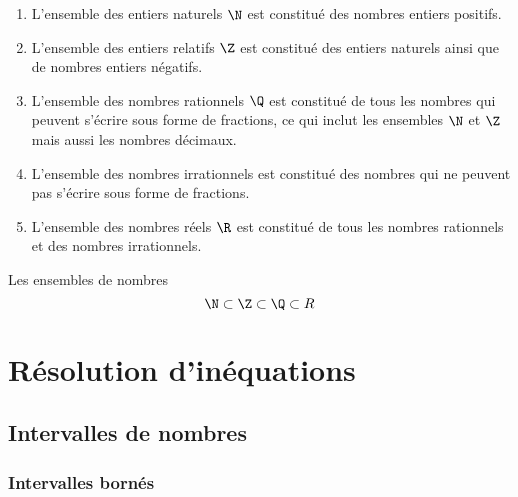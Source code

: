 \documentclass[xcolor={dvipsnames,svgnames,table}]{beamer}
\begin{document}
\begin{frame}
    \begin{definition}\pause
        \begin{enumerate}
            \item L'ensemble des entiers \alert{naturels} $\N$ est constitué des nombres entiers positifs.\pause
            \item L'ensemble des entiers \alert{relatifs} $\Z$ est constitué des entiers naturels ainsi que de nombres entiers négatifs.\pause
            \item L'ensemble des nombres \alert{rationnels} $\Q$ est constitué de tous les nombres qui peuvent s'écrire sous forme de fractions, ce qui inclut les ensembles $\N$ et $\Z$ mais aussi les nombres décimaux.\pause
            \item L'ensemble des nombres \alert{irrationnels} est constitué des nombres qui ne peuvent pas s'écrire sous forme de fractions.\pause
            \item L'ensemble des nombres \alert{réels} $\R$ est constitué de tous les nombres rationnels et des nombres irrationnels.
        \end{enumerate}
    \end{definition}
\end{frame}

\begin{frame}{Les ensembles de nombres}
    \[\N \subset \Z \subset \Q \subset R\]
    \rule{0pt}{6cm}
\end{frame}

\section{Résolution d'inéquations}
\subsection{Intervalles de nombres}
\subsubsection{Intervalles bornés}
\end{document}
